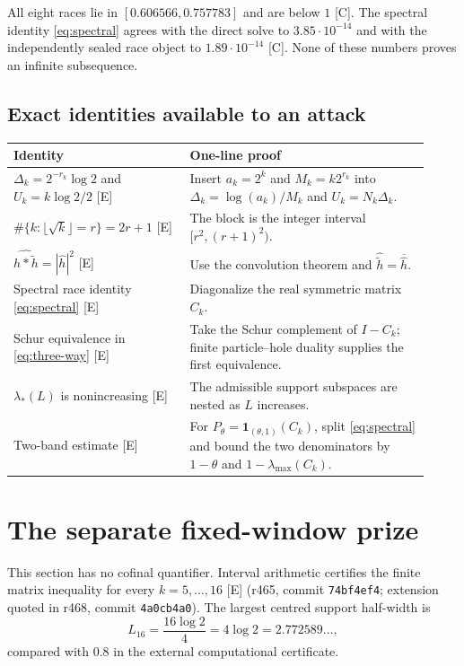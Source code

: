 \documentclass[11pt]{article}
\newcommand{\Egrade}{\textnormal{\small[E]}}
\newcommand{\Cgrade}{\textnormal{\small[C]}}
\begin{document}
\noindent
All eight races lie in $[0.606566,0.757783]$ and are below $1$
\Cgrade.  The spectral identity \eqref{eq:spectral} agrees with the
direct solve to $3.85\cdot10^{-14}$ and with the independently
sealed race object to $1.89\cdot10^{-14}$ \Cgrade.  None of these
numbers proves an infinite subsequence.

\subsection{Exact identities available to an attack}

\begin{longtable}{@{}p{0.39\linewidth}p{0.53\linewidth}@{}}
\toprule
Identity & One-line proof\\
\midrule
\endhead
$\Delta_k=2^{-r_k}\log2$ and
$U_k=k\log2/2$ \Egrade &
Insert $a_k=2^k$ and $M_k=k2^{r_k}$ into
$\Delta_k=\log(a_k)/M_k$ and $U_k=N_k\Delta_k$.\\
\addlinespace
$\#\{k:\lfloor\sqrt{k}\rfloor=r\}=2r+1$ \Egrade &
The block is the integer interval $[r^2,(r+1)^2)$.\\
\addlinespace
$\widehat{h*\widetilde h}=|\widehat h|^2$ \Egrade &
Use the convolution theorem and
$\widehat{\widetilde h}=\overline{\widehat h}$.\\
\addlinespace
Spectral race identity \eqref{eq:spectral} \Egrade &
Diagonalize the real symmetric matrix $C_k$.\\
\addlinespace
Schur equivalence in \eqref{eq:three-way} \Egrade &
Take the Schur complement of $I-C_k$; finite
particle--hole duality supplies the first equivalence.\\
\addlinespace
$\lambda_*(L)$ is nonincreasing \Egrade &
The admissible support subspaces are nested as $L$ increases.\\
\addlinespace
Two-band estimate \Egrade &
For $P_\theta=\mathbf1_{(\theta,1)}(C_k)$, split
\eqref{eq:spectral} and bound the two denominators by
$1-\theta$ and $1-\lambda_{\max}(C_k)$.\\
\bottomrule
\end{longtable}

\section{The separate fixed-window prize}\label{sec:fixedL}

This section has no cofinal quantifier.  Interval arithmetic
certifies the finite matrix inequality for every
$k=5,\ldots,16$ \Egrade{} (r465, commit \texttt{74bf4ef4};
extension quoted in r468, commit \texttt{4a0cb4a0}).  The largest
centred support half-width is
\[
 L_{16}=\frac{16\log2}{4}=4\log2=2.772589\ldots,
\]
compared with $0.8$ in the external computational certificate.
\end{document}
